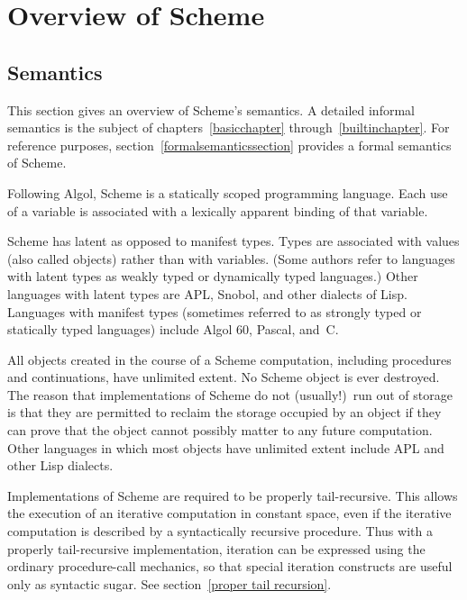 
\chapter{Overview of Scheme}

\section{Semantics}
\label{semanticsection}

This section gives an overview of Scheme's semantics.  A
detailed informal semantics is the subject of
chapters~\ref{basicchapter} through~\ref{builtinchapter}.  For reference
purposes, section~\ref{formalsemanticssection} provides a formal
semantics of Scheme.

\vest Following Algol, Scheme is a statically scoped programming
language.  Each use of a variable is associated with a lexically
apparent binding of that variable.

\vest Scheme has latent as opposed to manifest types.  Types
are associated with values (also called objects) rather than
with variables.  (Some authors refer to languages with latent types as
weakly typed or dynamically typed languages.)  Other languages with
latent types are APL, Snobol, and other dialects of Lisp.  Languages
with manifest types (sometimes referred to as strongly typed or
statically typed languages) include Algol 60, Pascal, and~C.

\vest All objects created in the course of a Scheme computation, including
procedures and continuations, have unlimited extent.
No Scheme object is ever destroyed.  The reason that
implementations of Scheme do not (usually!)\ run out of storage is that
they are permitted to reclaim the storage occupied by an object if
they can prove that the object cannot possibly matter to any future
computation.  Other languages in which most objects have unlimited
extent include APL and other Lisp dialects.

\vest Implementations of Scheme are required to be properly tail-recursive.
This allows the execution of an iterative computation in constant space,
even if the iterative computation is described by a syntactically
recursive procedure.  Thus with a properly tail-recursive implementation,
iteration can be expressed using the ordinary procedure-call
mechanics, so that special iteration constructs are useful only as
syntactic sugar.  See section~\ref{proper tail recursion}.


